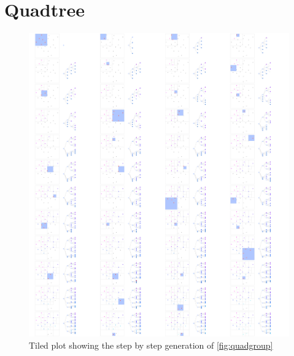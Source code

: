 \section{Quadtree }

\begin{figure}[H]
     \centering
 \includegraphics[width=\textwidth]{figures_c1/layout/quadtile.png}
        \caption{ Tiled plot showing the step by step generation of \autoref{fig:quadgroup}}
     \label{fig:quadtile}
\end{figure}
